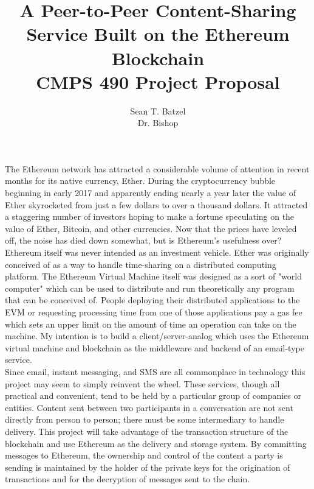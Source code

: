 \documentclass[]{report}
\title{A Peer-to-Peer Content-Sharing Service Built on the Ethereum Blockchain\\\large CMPS 490 Project Proposal}
\author{Sean T. Batzel\\Dr. Bishop}
\begin{document}
\maketitle

\nocite{*}

The Ethereum network has attracted a considerable volume of attention in recent months for its native currency, Ether.\cite{ethereum} During the cryptocurrency bubble beginning in early 2017 and apparently ending nearly a year later the value of Ether skyrocketed from just a few dollars to over a thousand dollars. It attracted a staggering number of investors hoping to make a fortune speculating on the value of Ether, Bitcoin, and other currencies. Now that the prices have leveled off, the noise has died down somewhat, but is Ethereum's usefulness over? Ethereum itself was never intended as an investment vehicle. Ether was originally conceived of as a way to handle time-sharing on a distributed computing platform. The Ethereum Virtual Machine itself was designed as a sort of "world computer" which can be used to distribute and run theoretically any program that can be conceived of. People deploying their distributed applications to the EVM or requesting processing time from one of those applications pay a \gls{gas} fee which sets an upper limit on the amount of time an operation can take on the machine.\cite{yellowpaper} My intention is to build a client/server-analog which uses the Ethereum virtual machine and \gls{blockchain} as the middleware and backend of an email-type service.\\

Since email, instant messaging, and SMS are all commonplace in technology this project may seem to simply reinvent the wheel. These services, though all practical and convenient, tend to be held by a particular group of companies or entities. Content sent between two participants in a conversation are not sent directly from person to person; there must be some intermediary to handle delivery. This project will take advantage of the transaction structure of the blockchain and use Ethereum as the delivery and storage system. By committing messages to Ethereum, the ownership and control of the content a party is sending is maintained by the holder of the private keys for the origination of transactions and for the decryption of messages sent to the chain.\\
\end{document}
